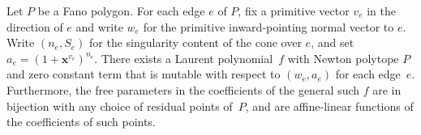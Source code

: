 \begin{CoatesProp} 
Let $P$ be a Fano polygon. For each edge $e$ of $P$, fix a primitive vector $v_e$ in the direction of $e$ and write $w_e$ for the primitive inward-pointing normal vector to $e$. Write $(n_e, S_e)$ for the singularity content of the cone over $e$, and set $a_e = (1+\bm{x}^{v_e})^{n_e}$. There exists a Laurent polynomial~$f$ with Newton polytope $P$ and zero constant term that is mutable with respect to $(w_e, a_e)$ for each edge~$e$. Furthermore, the free parameters in the coefficients of the general such $f$ are in bijection with any choice of residual points of~$P$, and are affine-linear functions of the coefficients of such points.
\end{CoatesProp}
